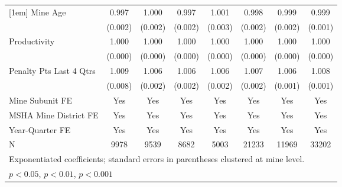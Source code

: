 {\begin{tabular}{l*{7}{c}}
[1em]
Mine Age                 &       0.997         &       1.000         &       0.997         &       1.001         &       0.998         &       0.999         &       0.999         \\
                         &     (0.002)         &     (0.002)         &     (0.002)         &     (0.003)         &     (0.002)         &     (0.002)         &     (0.001)         \\
[1em]
Productivity             &       1.000         &       1.000\sym{*}  &       1.000         &       1.000         &       1.000\sym{*}  &       1.000         &       1.000         \\
                         &     (0.000)         &     (0.000)         &     (0.000)         &     (0.000)         &     (0.000)         &     (0.000)         &     (0.000)         \\
[1em]
Penalty Pts Last 4 Qtrs  &       1.009         &       1.006\sym{***}&       1.006\sym{***}&       1.006\sym{**} &       1.007\sym{***}&       1.006\sym{***}&       1.008\sym{***}\\
                         &     (0.008)         &     (0.002)         &     (0.002)         &     (0.002)         &     (0.002)         &     (0.001)         &     (0.001)         \\
[1em]
Mine Subunit FE          &         Yes         &         Yes         &         Yes         &         Yes         &         Yes         &         Yes         &         Yes         \\
[1em]
MSHA Mine District FE    &         Yes         &         Yes         &         Yes         &         Yes         &         Yes         &         Yes         &         Yes         \\
[1em]
Year-Quarter FE          &         Yes         &         Yes         &         Yes         &         Yes         &         Yes         &         Yes         &         Yes         \\
\hline
N                        &        9978         &        9539         &        8682         &        5003         &       21233         &       11969         &       33202         \\
\hline\hline
\multicolumn{8}{l}{\footnotesize Exponentiated coefficients; standard errors in parentheses clustered at mine level.}\\
\multicolumn{8}{l}{\footnotesize \sym{*} \(p<0.05\), \sym{**} \(p<0.01\), \sym{***} \(p<0.001\)}\\
\end{tabular}
}
